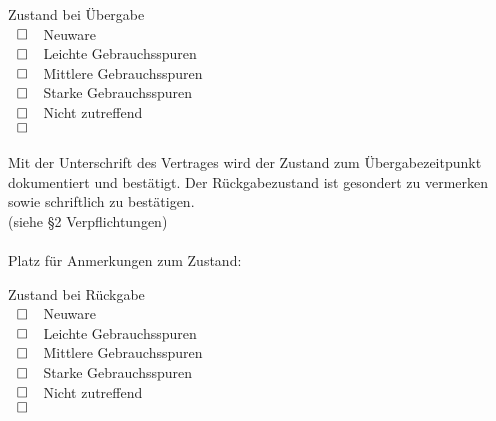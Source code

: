 \documentclass[article, 11pt,a4paper, titlepage, parskip=half, bibliography=totocnumbered]{scrreprt}
\begin{document}
\begin{contract}
		\parnumberfalse
		
		\begin{multicols}{2}
				Zustand bei Übergabe \\
				$\makebox[20pt][L]{$\square$}\raisebox{.15ex}{\hspace{0.1em}}$ Neuware \\
				$\makebox[20pt][L]{$\square$}\raisebox{.15ex}{\hspace{0.1em}}$ Leichte Gebrauchsspuren \\
				$\makebox[20pt][L]{$\square$}\raisebox{.15ex}{\hspace{0.1em}}$ Mittlere Gebrauchsspuren \\
				$\makebox[20pt][L]{$\square$}\raisebox{.15ex}{\hspace{0.1em}}$ Starke Gebrauchsspuren \\
				$\makebox[20pt][L]{$\square$}\raisebox{.15ex}{\hspace{0.1em}}$ Nicht zutreffend \\
				$\makebox[20pt][L]{$\square$}\raisebox{.15ex}{\hspace{0.1em}}$ \\
			
				~ \\
				Mit der Unterschrift des Vertrages wird der Zustand zum Übergabezeitpunkt dokumentiert und bestätigt. Der Rückgabezustand ist gesondert zu vermerken sowie schriftlich zu bestätigen. \\
				(siehe §2 Verpflichtungen) \\ \\
				Platz für Anmerkungen zum Zustand: \\
				
			
			\columnbreak
				Zustand bei Rückgabe \\
				$\makebox[20pt][L]{$\square$}\raisebox{.15ex}{\hspace{0.1em}}$ Neuware \\
				$\makebox[20pt][L]{$\square$}\raisebox{.15ex}{\hspace{0.1em}}$ Leichte Gebrauchsspuren \\
				$\makebox[20pt][L]{$\square$}\raisebox{.15ex}{\hspace{0.1em}}$ Mittlere Gebrauchsspuren \\
				$\makebox[20pt][L]{$\square$}\raisebox{.15ex}{\hspace{0.1em}}$ Starke Gebrauchsspuren \\
				$\makebox[20pt][L]{$\square$}\raisebox{.15ex}{\hspace{0.1em}}$ Nicht zutreffend \\
				$\makebox[20pt][L]{$\square$}\raisebox{.15ex}{\hspace{0.1em}}$ \\
				

\end{multicols}
\end{contract}
\end{document}
